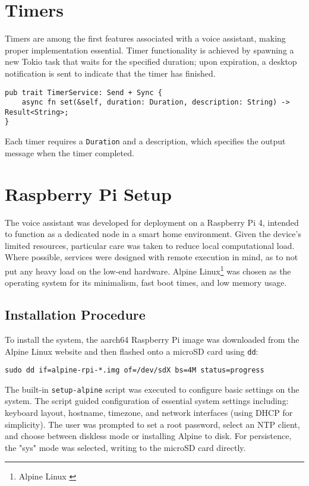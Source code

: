 \section{Timers}
Timers are among the first features associated with a voice assistant,
making proper implementation essential.
Timer functionality is achieved by spawning a new Tokio task that waits for the specified duration;
upon expiration, a desktop notification is sent to indicate that the timer has finished.

\begin{verbatim}
pub trait TimerService: Send + Sync {
    async fn set(&self, duration: Duration, description: String) -> Result<String>;
}
\end{verbatim}
Each timer requires a \texttt{Duration} and a description,
which specifies the output message when the timer completed.

\section{Raspberry Pi Setup}
The voice assistant was developed for deployment on a Raspberry Pi 4,
intended to function as a dedicated node in a smart home environment.
Given the device's limited resources, particular care was taken to reduce local computational load.
Where possible, services were designed with remote execution in mind,
as to not put any heavy load on the low-end hardware.
Alpine Linux\footnote{Alpine Linux \cite{alpine}}
was chosen as the operating system for its minimalism, fast boot times, and low memory usage.

\subsection{Installation Procedure}
To install the system, the aarch64 Raspberry Pi image was downloaded from the Alpine Linux website
and then flashed onto a microSD card using \texttt{dd}:
\begin{verbatim}
sudo dd if=alpine-rpi-*.img of=/dev/sdX bs=4M status=progress
\end{verbatim}

The built-in \texttt{setup-alpine} script was executed to configure basic settings on the system.
The script guided configuration of essential system settings including:
keyboard layout, hostname, timezone, and network interfaces (using DHCP for simplicity).
The user was prompted to set a root password, select an NTP client,
and choose between diskless mode or installing Alpine to disk.
For persistence, the "sys" mode was selected, writing to the microSD card directly.

